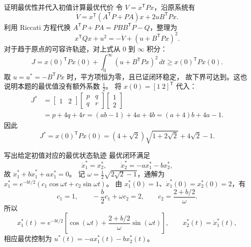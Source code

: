 \documentclass[11pt]{article}
\begin{document}
\begin{solution}
\tcbbreak
\begin{proofstep}{证明最优性并代入初值计算最优代价}
令 $V=x^{\mathsf T}Px$，沿原系统有
\[
 \dot V=x^{\mathsf T}(A^{\mathsf T}P+PA)x
 +2uB^{\mathsf T}Px.
\]
利用 Riccati 方程代换 $A^{\mathsf T}P+PA=PBB^{\mathsf T}P-Q$，整理为
\[
 x^{\mathsf T}Qx+u^2
 =-\dot V+(u+B^{\mathsf T}Px)^2.
\]
对于趋于原点的可容许轨迹，对上式从 $0$ 到 $\infty$ 积分：
\[
 J=x(0)^{\mathsf T}Px(0)
 +\int_0^\infty (u+B^{\mathsf T}Px)^2\,dt
 \geq x(0)^{\mathsf T}Px(0).
\]
取 $u=u^*=-B^{\mathsf T}Px$ 时，平方项恒为零，且已证闭环稳定，
故下界可达到。这也说明本题的最优值没有额外系数 $\tfrac12$。
将 $x(0)=[1\;2]^{\mathsf T}$ 代入：
\[
 \begin{aligned}
 J^*&=\begin{bmatrix}1&2\end{bmatrix}
       \begin{bmatrix}p&q\\q&r\end{bmatrix}\begin{bmatrix}1\\2\end{bmatrix}\\
 &=p+4q+4r=(ab-1)+4a+4b=(a+4)b+4a-1.
 \end{aligned}
\]
因此
\[
 \boxed{J^*=x(0)^{\mathsf T}Px(0)
 =(4+\sqrt2)\sqrt{1+2\sqrt2}+4\sqrt2-1.}
\]
\end{proofstep}
\begin{proofstep}{写出给定初值对应的最优状态轨迹}
最优闭环满足
\[
 \dot x_1^*=x_2^*,\qquad \dot x_2^*=-ax_1^*-bx_2^*,
\]
故 $\ddot x_1^*+b\dot x_1^*+ax_1^*=0$。
记 $\omega=\tfrac12\sqrt{2\sqrt2-1}$，通解为
$x_1^*=e^{-bt/2}(c_1\cos\omega t+c_2\sin\omega t)$。
由 $x_1^*(0)=1$、$\dot x_1^*(0)=x_2^*(0)=2$，有
\[
 c_1=1,\qquad -\frac b2c_1+\omega c_2=2,
 \qquad c_2=\frac{2+b/2}{\omega}.
\]
所以
\[
 x_1^*(t)=e^{-bt/2}\left[
 \cos(\omega t)+\frac{2+b/2}{\omega}\sin(\omega t)\right],
 \qquad x_2^*(t)=\dot x_1^*(t),
\]
相应最优控制为 $u^*(t)=-ax_1^*(t)-bx_2^*(t)$。
\end{proofstep}
\end{solution}
\end{document}
